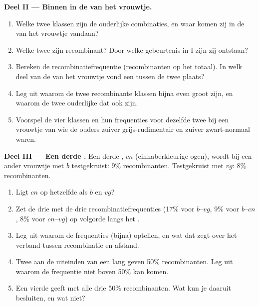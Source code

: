 \begin{problem}
\medskip
\noindent\textbf{Deel II --- Binnen in de  van het vrouwtje.}
\begin{enumerate}[resume]
  \item Welke twee klassen zijn de ouderlijke combinaties, en waar komen
        zij in de  van het vrouwtje vandaan?
  \item Welke twee zijn recombinant? Door welke gebeurtenis in  I
        zijn zij ontstaan?
  \item Bereken de recombinatiefrequentie (recombinanten op het totaal).
        In welk deel van de  van het vrouwtje vond een
         tussen de twee  plaats?
  \item Leg uit waarom de twee recombinante klassen bijna even groot
        zijn, en waarom de twee ouderlijke dat ook zijn.
  \item Voorspel de vier klassen en hun frequenties voor dezelfde twee
         bij een vrouwtje van wie de ouders zuiver grijs-rudimentair
        en zuiver zwart-normaal waren.
\end{enumerate}

\medskip
\noindent\textbf{Deel III --- Een derde .}
Een derde , $cn$ (cinnaberkleurige ogen), wordt bij een ander vrouwtje
met $b$ testgekruist: 9\% recombinanten. Testgekruist met $vg$: 8\%
recombinanten.
\begin{enumerate}[resume]
  \item Ligt $cn$ op hetzelfde  als $b$ en $vg$?
  \item Zet de drie  met de drie recombinatiefrequenties (17\% voor
        $b$--$vg$, 9\% voor $b$--$cn$, 8\% voor $cn$--$vg$) op volgorde
        langs het .
  \item Leg uit waarom de frequenties (bijna) optellen, en wat dat zegt
        over het verband tussen recombinatie en afstand.
  \item Twee  aan de uiteinden van een lang  geven 50\%
        recombinanten. Leg uit waarom de frequentie niet boven 50\% kan
        komen.
  \item Een vierde  geeft met alle drie 50\% recombinanten. Wat kun je
        daaruit besluiten, en wat niet?
\end{enumerate}


\end{problem}
